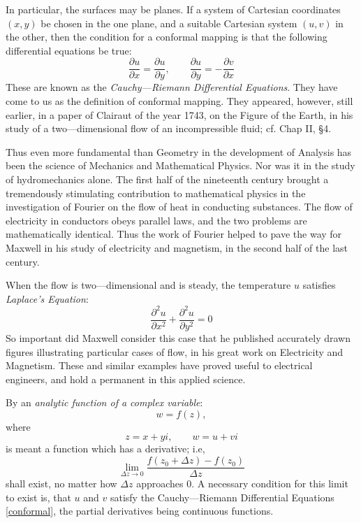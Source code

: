 In particular, the surfaces may be planes. If a system of Cartesian coordinates $(x,y)$ be chosen in the one plane, and a suitable Cartesian system  $(u,v)$ in the other, then the condition for a conformal mapping is that the following differential equations be true:
\begin{equation}\label{conformal}
\frac{\partial u}{\partial x} =\frac{\partial u}{\partial y} , \qquad \frac{\partial u}{\partial y} =-\frac{\partial v}{\partial x} 
\end{equation} 
These are known as the \emph{Cauchy---Riemann Differential Equations}. They have come to us as the definition of conformal mapping. They appeared, however, still earlier, in a paper of Clairaut of the year 1743, on the Figure of the Earth, in his study of a two---dimensional flow of an incompressible fluid; cf. Chap II, \S 4. 

Thus even more fundamental than Geometry in the development of Analysis has been the science of Mechanics and Mathematical Physics. Nor was it in the study of hydromechanics alone. The first half of the nineteenth century brought a tremendously stimulating contribution to mathematical physics in the investigation of Fourier on the flow of heat in conducting substances. The flow of electricity in conductors obeys parallel laws, and the two problems are mathematically identical. Thus the work of Fourier helped to pave the way for Maxwell in his study of electricity and magnetism, in the second half of the last century. 

When the flow is two---dimensional and is steady, the temperature $u$ satisfies \emph{Laplace's Equation}:
\begin{equation}\label{laplace}
\frac{\partial^2 u}{\partial x^2} +\frac{\partial^2 u}{\partial y^2} =0
\end{equation}
So important did Maxwell consider this case that he published accurately drawn figures illustrating particular cases of flow, in his great work on Electricity and Magnetism. These and similar examples have proved useful to electrical engineers, and hold a permanent in this applied science. 

By an \emph{analytic function of a complex variable}:
\[
	w=f(z)
,\]where 
\[
z=x+yi, \qquad w=u+vi
\] is meant a function which has a derivative; i.e, 
\[
	\lim\limits_{\Delta z \to 0} \frac{f(z_0+\Delta z)-f(z_0)}{\Delta z} 
\] shall exist, no matter how $\Delta z$ approaches $0$. A necessary condition for this limit to exist is, that $u$ and $v$ satisfy the Cauchy---Riemann Differential Equations \ref{conformal}, the partial derivatives being continuous functions. 


